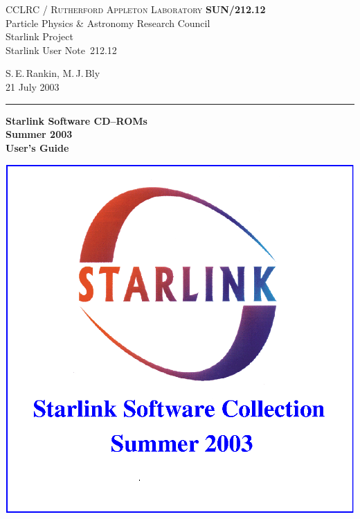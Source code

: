 \documentclass[twoside,11pt]{article}
\newcommand{\stardoccategory}  {Starlink User Note}
\newcommand{\stardocinitials}  {SUN}
\newcommand{\stardocnumber}    {212.12}
\newcommand{\stardocauthors}   {S.\,E.\,Rankin, M.\,J.\,Bly}
\newcommand{\stardocdate}      {21 July 2003}
\newcommand{\stardoctitle}     {Starlink Software CD--ROMs}
\newcommand{\stardocversion}   {Summer 2003}
\newcommand{\stardocmanual}    {User's Guide}
\newcommand{\stardocname}{\stardocinitials /\stardocnumber}
\newenvironment{latexonly}{}{}
\renewcommand{\_}{\texttt{\symbol{95}}}
\begin{document}
\thispagestyle{empty}

\begin{latexonly}
   CCLRC / \textsc{Rutherford Appleton Laboratory} \hfill \textbf{\stardocname}\\
   {\large Particle Physics \& Astronomy Research Council}\\
   {\large Starlink Project\\}
   {\large \stardoccategory\ \stardocnumber}
   \begin{flushright}
   \stardocauthors\\
   \stardocdate
   \end{flushright}
   \vspace{-4mm}
   \rule{\textwidth}{0.5mm}
   \vspace{5mm}
   \begin{center}
   {\Huge\textbf{\stardoctitle \\ [2.5ex]}}
   {\LARGE\textbf{\stardocversion \\ [4ex]}}
   {\Huge\textbf{\stardocmanual}}
   \end{center}
   \vspace{5mm}

\centering \includegraphics[scale=1.0]{sun212_cover}


\end{latexonly}
\end{document}
